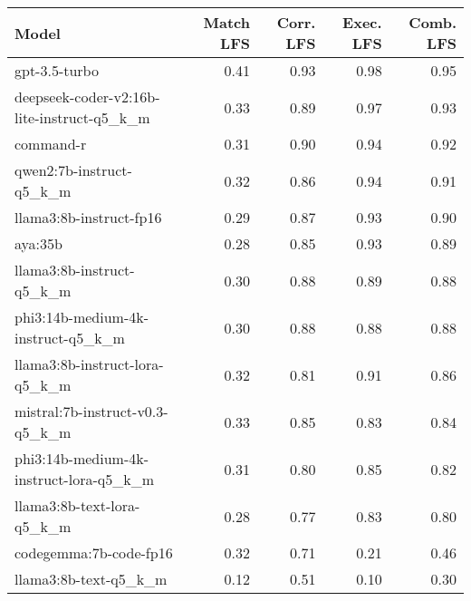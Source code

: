 \begin{tabular}{lrrrr}
\toprule
Model & Match LFS & Corr. LFS & Exec. LFS & Comb. LFS \\
\midrule
gpt-3.5-turbo & 0.41 & 0.93 & 0.98 & 0.95 \\
deepseek-coder-v2:16b-lite-instruct-q5\_k\_m & 0.33 & 0.89 & 0.97 & 0.93 \\
command-r & 0.31 & 0.90 & 0.94 & 0.92 \\
qwen2:7b-instruct-q5\_k\_m & 0.32 & 0.86 & 0.94 & 0.91 \\
llama3:8b-instruct-fp16 & 0.29 & 0.87 & 0.93 & 0.90 \\
aya:35b & 0.28 & 0.85 & 0.93 & 0.89 \\
llama3:8b-instruct-q5\_k\_m & 0.30 & 0.88 & 0.89 & 0.88 \\
phi3:14b-medium-4k-instruct-q5\_k\_m & 0.30 & 0.88 & 0.88 & 0.88 \\
llama3:8b-instruct-lora-q5\_k\_m & 0.32 & 0.81 & 0.91 & 0.86 \\
mistral:7b-instruct-v0.3-q5\_k\_m & 0.33 & 0.85 & 0.83 & 0.84 \\
phi3:14b-medium-4k-instruct-lora-q5\_k\_m & 0.31 & 0.80 & 0.85 & 0.82 \\
llama3:8b-text-lora-q5\_k\_m & 0.28 & 0.77 & 0.83 & 0.80 \\
codegemma:7b-code-fp16 & 0.32 & 0.71 & 0.21 & 0.46 \\
llama3:8b-text-q5\_k\_m & 0.12 & 0.51 & 0.10 & 0.30 \\
\bottomrule
\end{tabular}
